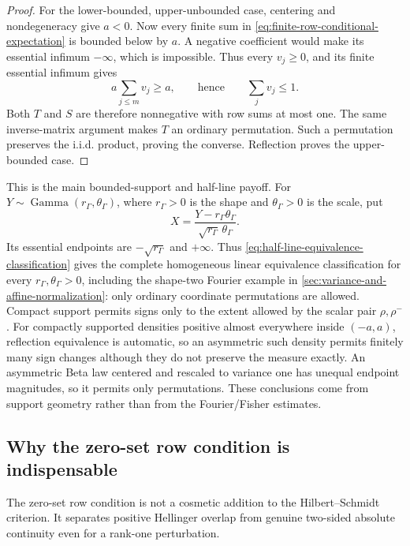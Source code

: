 \begin{proof}
For the lower-bounded, upper-unbounded case, centering and
nondegeneracy give \(a<0\).
Now every finite sum in \eqref{eq:finite-row-conditional-expectation}
is bounded below by \(a\).
A negative coefficient would make its essential infimum
\(-\infty\), which is impossible.
Thus every \(v_j\geq0\), and its finite essential infimum gives
\[
 a\sum_{j\leq m}v_j\geq a,
 \qquad\text{hence}\qquad \sum_jv_j\leq1.
\]
Both \(T\) and \(S\) are therefore nonnegative with row sums at
most one.
The same inverse-matrix argument makes \(T\) an ordinary
permutation.
Such a permutation preserves the i.i.d. product, proving the
converse.
Reflection proves the upper-bounded case.
\end{proof}

This is the main bounded-support and half-line payoff.
For \(Y\sim\operatorname{Gamma}(r_\Gamma,\theta_\Gamma)\), where
\(r_\Gamma>0\) is the shape and \(\theta_\Gamma>0\) is the scale, put
\[
 X=\frac{Y-r_\Gamma\theta_\Gamma}
         {\sqrt{r_\Gamma}\,\theta_\Gamma}.
\]
Its essential endpoints are \(-\sqrt{r_\Gamma}\) and \(+\infty\).
Thus \eqref{eq:half-line-equivalence-classification} gives the complete
homogeneous linear equivalence classification for every
\(r_\Gamma,\theta_\Gamma>0\), including the shape-two Fourier example in
\cref{sec:variance-and-affine-normalization}: only ordinary coordinate
permutations are allowed.
Compact support permits signs only to the extent allowed by the scalar pair
\(\rho,\rho^-\).
For compactly supported densities positive almost everywhere inside
\((-a,a)\), reflection equivalence is automatic, so an asymmetric such
density permits finitely many sign changes although they do not preserve the
measure exactly.
An asymmetric Beta law centered and rescaled to variance one has unequal
endpoint magnitudes, so it
permits only permutations.
These conclusions come from support geometry rather than from the
Fourier/Fisher estimates.

\subsection{Why the zero-set row condition is indispensable}
\label{sec:zero-set-row-condition-counterexample}

The zero-set row condition is not a cosmetic addition to the
Hilbert--Schmidt criterion.
It separates positive Hellinger overlap from genuine two-sided absolute
continuity even for a rank-one perturbation.

